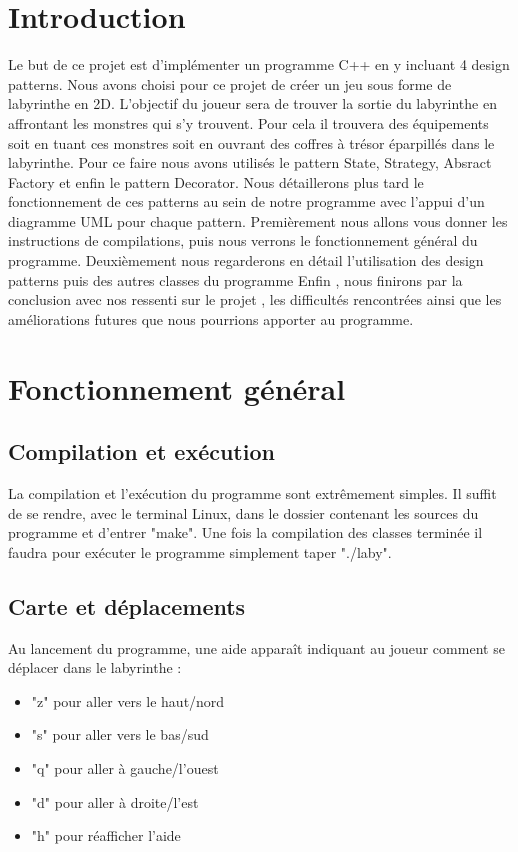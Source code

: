 \documentclass[a4paper]{article}
\begin{document}
  \section{Introduction}

Le but de ce projet est d’implémenter un programme C++ en y incluant 4 design patterns.
Nous avons choisi pour ce projet de créer un jeu sous forme de labyrinthe en 2D.
L'objectif du joueur sera de trouver la sortie du labyrinthe en affrontant les monstres qui s'y trouvent.
Pour cela il trouvera des équipements soit en tuant ces monstres soit en ouvrant des coffres à trésor éparpillés dans le labyrinthe.
Pour ce faire nous avons utilisés le pattern State, Strategy, Absract Factory et enfin le pattern Decorator.
Nous détaillerons plus tard le fonctionnement de ces patterns au sein de notre programme avec l'appui d'un diagramme UML pour chaque pattern.
Premièrement nous allons vous donner les instructions de compilations, puis nous verrons le fonctionnement général du programme.
Deuxièmement nous regarderons en détail l'utilisation des design patterns puis des autres classes du programme
Enfin , nous finirons par la conclusion avec nos ressenti sur le projet , les difficultés rencontrées ainsi que les améliorations futures que nous pourrions apporter au programme.


  \section{Fonctionnement général}

    \subsection{Compilation et exécution}

La compilation et l’exécution du programme sont extrêmement simples.
Il suffit de se rendre, avec le terminal Linux, dans le dossier contenant les sources du programme et d'entrer "make".
Une fois la compilation des classes terminée il faudra pour exécuter le programme simplement taper "./laby".


    \subsection{Carte et déplacements}

Au lancement du programme, une aide apparaît indiquant au joueur comment se déplacer dans le labyrinthe :
\begin{itemize}
	\item "z" pour aller vers le haut/nord
	\item "s" pour aller vers le bas/sud
	\item "q" pour aller à gauche/l'ouest
	\item "d" pour aller à droite/l'est
	\item "h" pour réafficher l'aide
\end{itemize}
\end{document}
